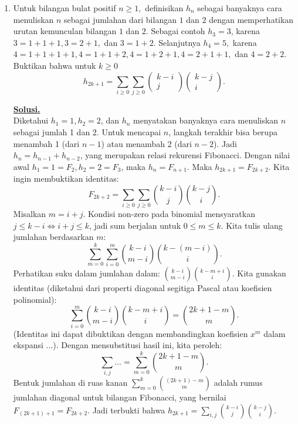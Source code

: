 \documentclass[12pt,twoside]{article}
\newenvironment{solution}
{
	\par\noindent\textbf{\underline{Solusi.}}\\
}
{
	\par
}
\begin{document}
\begin{enumerate}
  \item Untuk bilangan bulat positif $n \geq 1,$ definisikan $h_n$ sebagai banyaknya cara menuliskan $n$ sebagai jumlahan dari bilangan $1$ dan $2$ dengan memperhatikan urutan kemunculan bilangan $1$ dan $2$. Sebagai contoh $h_3 = 3$, karena $3=1+1+1,3=2+1,$ dan $3=1+2.$ Selanjutnya $h_4=5,$ karena $4 = 1+1+1+1, 4= 1+1+2, 4=1+2+1,4=2+1+1,$ dan $4 = 2+2$. Buktikan bahwa untuk $k \geq 0$
        \begin{equation*}
          h_{2k+1} = \displaystyle\sum_{i\geq 0}^{}\sum_{j\geq 0}^{} \begin{pmatrix}
            k-i \\j
          \end{pmatrix}\begin{pmatrix}
            k-j \\i
          \end{pmatrix}.
        \end{equation*}

        \begin{solution}
          Diketahui $h_1=1, h_2=2$, dan $h_n$ menyatakan banyaknya cara menuliskan $n$ sebagai jumlah 1 dan 2. Untuk mencapai $n$, langkah terakhir bisa berupa menambah 1 (dari $n-1$) atau menambah 2 (dari $n-2$).
          Jadi $h_n = h_{n-1} + h_{n-2}$, yang merupakan relasi rekurensi Fibonacci. Dengan nilai awal $h_1=1=F_2, h_2=2=F_3$, maka $h_n = F_{n+1}$.
          Maka $h_{2k+1} = F_{2k+2}$.
          Kita ingin membuktikan identitas:
          \[ F_{2k+2} = \sum_{i \ge 0} \sum_{j \ge 0} \binom{k-i}{j} \binom{k-j}{i}. \]
          Misalkan $m = i+j$. Kondisi non-zero pada binomial mensyaratkan $j \le k-i \iff i+j \le k$, jadi sum berjalan untuk $0 \le m \le k$.
          Kita tulis ulang jumlahan berdasarkan $m$:
          \[ \sum_{m=0}^k \sum_{i=0}^m \binom{k-i}{m-i} \binom{k-(m-i)}{i}. \]
          Perhatikan suku dalam jumlahan dalam: $\binom{k-i}{m-i} \binom{k-m+i}{i}$.
          Kita gunakan identitas (diketahui dari properti diagonal segitiga Pascal atau koefisien polinomial):
          \[ \sum_{i=0}^m \binom{k-i}{m-i} \binom{k-m+i}{i} = \binom{2k+1-m}{m}. \]
          (Identitas ini dapat dibuktikan dengan membandingkan koefisien $x^m$ dalam ekspansi $\dots$).
          Dengan mensubstitusi hasil ini, kita peroleh:
          \[ \sum_{i,j} \dots = \sum_{m=0}^k \binom{2k+1-m}{m}. \]
          Bentuk jumlahan di ruas kanan $\sum_{m=0}^k \binom{(2k+1)-m}{m}$ adalah rumus jumlahan diagonal untuk bilangan Fibonacci, yang bernilai $F_{(2k+1)+1} = F_{2k+2}$.
          Jadi terbukti bahwa $h_{2k+1} = \sum_{i,j} \binom{k-i}{j} \binom{k-j}{i}$.
        \end{solution}



\end{enumerate}
\end{document}
